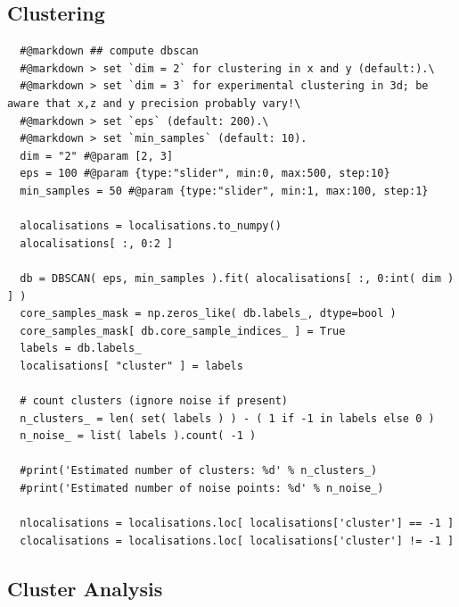\documentclass[11pt, a4paper, oneside, twocolumn]{report}
\begin{document}
\subsection{Clustering}

\begin{verbatim}
  #@markdown ## compute dbscan
  #@markdown > set `dim = 2` for clustering in x and y (default:).\
  #@markdown > set `dim = 3` for experimental clustering in 3d; be aware that x,z and y precision probably vary!\
  #@markdown > set `eps` (default: 200).\
  #@markdown > set `min_samples` (default: 10).
  dim = "2" #@param [2, 3]
  eps = 100 #@param {type:"slider", min:0, max:500, step:10}
  min_samples = 50 #@param {type:"slider", min:1, max:100, step:1}

  alocalisations = localisations.to_numpy()
  alocalisations[ :, 0:2 ]

  db = DBSCAN( eps, min_samples ).fit( alocalisations[ :, 0:int( dim ) ] )
  core_samples_mask = np.zeros_like( db.labels_, dtype=bool )
  core_samples_mask[ db.core_sample_indices_ ] = True
  labels = db.labels_
  localisations[ "cluster" ] = labels

  # count clusters (ignore noise if present)
  n_clusters_ = len( set( labels ) ) - ( 1 if -1 in labels else 0 )
  n_noise_ = list( labels ).count( -1 )

  #print('Estimated number of clusters: %d' % n_clusters_)
  #print('Estimated number of noise points: %d' % n_noise_)

  nlocalisations = localisations.loc[ localisations['cluster'] == -1 ]
  clocalisations = localisations.loc[ localisations['cluster'] != -1 ]
\end{verbatim}


\subsection{Cluster Analysis}
\end{document}
